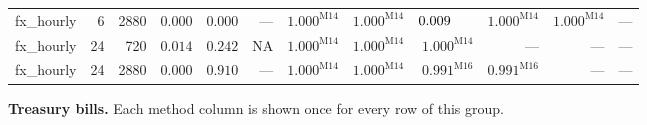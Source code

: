 \documentclass[10pt,a4paper]{article}
\begin{document}
\begin{longtable}{@{}lrrrrrrrrrrr@{}}
fx\_hourly & 6 & 2880 & $0.000$ & $0.000$ & --- & $\mathbf{1.000}^{\mathrm{M14}}$ & $\mathbf{1.000}^{\mathrm{M14}}$ & $0.009\hphantom{^{\mathrm{M00}}}$ & $\mathbf{1.000}^{\mathrm{M14}}$ & $\mathbf{1.000}^{\mathrm{M14}}$ & --- \\
fx\_hourly & 24 & 720 & $0.014$ & $\mathbf{0.242}$ & \textsc{NA} & $\mathbf{1.000}^{\mathrm{M14}}$ & $\mathbf{1.000}^{\mathrm{M14}}$ & $\mathbf{1.000}^{\mathrm{M14}}$ & --- & --- & --- \\
fx\_hourly & 24 & 2880 & $0.000$ & $\mathbf{0.910}$ & --- & $\mathbf{1.000}^{\mathrm{M14}}$ & $\mathbf{1.000}^{\mathrm{M14}}$ & $\mathbf{0.991}^{\mathrm{M16}}$ & $\mathbf{0.991}^{\mathrm{M16}}$ & --- & --- \\
\end{longtable}

\clearpage
\noindent\textbf{Treasury bills.} Each method column is shown once for every row of this group.\par
\end{document}
